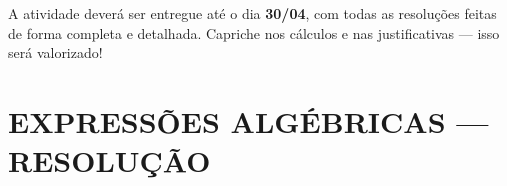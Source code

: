 \documentclass[a4paper]{article}
\begin{document}
	\fontsize{10}{15}\selectfont
	\vspace*{1mm}
	
	\section*{}
	\begin{tcolorbox}[colback=gray!10, colframe=black, boxrule=0.5mm, arc=4pt, title=\textbf{Orientações}]
		A atividade deverá ser entregue até o dia \textbf{30/04}, com todas as resoluções feitas de forma completa e detalhada. Capriche nos cálculos e nas justificativas — isso será valorizado!
	\end{tcolorbox}
	
	\section*{EXPRESSÕES ALGÉBRICAS — RESOLUÇÃO}
\end{document}
